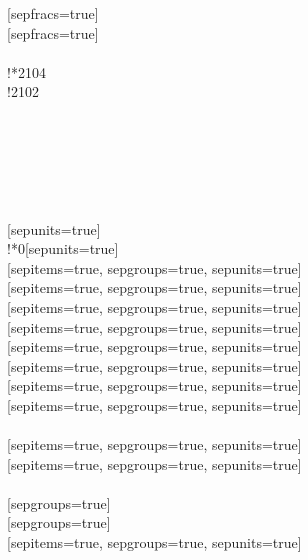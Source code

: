 {    [sepfracs=true]\\
    [sepfracs=true]\\
    \\
    \numToText!*{2}{104}\\
    \numToText!{2}{102}\\
    \\
    \\
    \\
    \\
    \\
    \\
    [sepunits=true]\\
    \numToText!*{0}[sepunits=true]\\
    [sepitems=true, sepgroups=true, sepunits=true]\\
    [sepitems=true, sepgroups=true, sepunits=true]\\
    [sepitems=true, sepgroups=true, sepunits=true]\\
    [sepitems=true, sepgroups=true, sepunits=true]\\
    [sepitems=true, sepgroups=true, sepunits=true]\\
    [sepitems=true, sepgroups=true, sepunits=true]\\
    [sepitems=true, sepgroups=true, sepunits=true]\\
    [sepitems=true, sepgroups=true, sepunits=true]\\
    \\
    [sepitems=true, sepgroups=true, sepunits=true]\\
    [sepitems=true, sepgroups=true, sepunits=true]\\
    \\
    [sepgroups=true]\\
    [sepgroups=true]\\
    [sepitems=true, sepgroups=true, sepunits=true]\\
}
